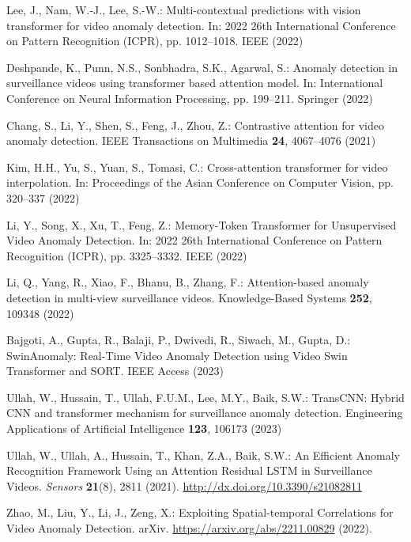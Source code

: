 \documentclass[runningheads]{llncs}
\begin{document}
\begin{thebibliography}{99}
Lee, J., Nam, W.-J., Lee, S.-W.: Multi-contextual predictions with vision transformer for video anomaly detection. In: 2022 26th International Conference on Pattern Recognition (ICPR), pp. 1012--1018. IEEE (2022)

Deshpande, K., Punn, N.S., Sonbhadra, S.K., Agarwal, S.: Anomaly detection in surveillance videos using transformer based attention model. In: International Conference on Neural Information Processing, pp. 199--211. Springer (2022)

Chang, S., Li, Y., Shen, S., Feng, J., Zhou, Z.: Contrastive attention for video anomaly detection. IEEE Transactions on Multimedia \textbf{24}, 4067--4076 (2021)

Kim, H.H., Yu, S., Yuan, S., Tomasi, C.: Cross-attention transformer for video interpolation. In: Proceedings of the Asian Conference on Computer Vision, pp. 320--337 (2022)

Li, Y., Song, X., Xu, T., Feng, Z.: Memory-Token Transformer for Unsupervised Video Anomaly Detection. In: 2022 26th International Conference on Pattern Recognition (ICPR), pp. 3325--3332. IEEE (2022)

Li, Q., Yang, R., Xiao, F., Bhanu, B., Zhang, F.: Attention-based anomaly detection in multi-view surveillance videos. Knowledge-Based Systems \textbf{252}, 109348 (2022)

Bajgoti, A., Gupta, R., Balaji, P., Dwivedi, R., Siwach, M., Gupta, D.: SwinAnomaly: Real-Time Video Anomaly Detection using Video Swin Transformer and SORT. IEEE Access (2023)

Ullah, W., Hussain, T., Ullah, F.U.M., Lee, M.Y., Baik, S.W.: TransCNN: Hybrid CNN and transformer mechanism for surveillance anomaly detection. Engineering Applications of Artificial Intelligence \textbf{123}, 106173 (2023)

Ullah, W., Ullah, A., Hussain, T., Khan, Z.A., Baik, S.W.: An Efficient Anomaly Recognition Framework Using an Attention Residual LSTM in Surveillance Videos. \textit{Sensors} \textbf{21}(8), 2811 (2021). \url{http://dx.doi.org/10.3390/s21082811}

Zhao, M., Liu, Y., Li, J., Zeng, X.: Exploiting Spatial-temporal Correlations for Video Anomaly Detection. arXiv. \url{https://arxiv.org/abs/2211.00829} (2022). 


\end{thebibliography}
\end{document}
